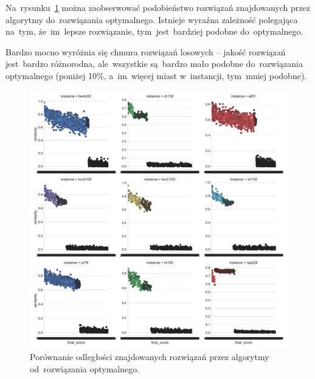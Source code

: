 Na~rysunku~\ref{fig:sim} można zaobserwować podobieństwo rozwiązań znajdowanych przez algorytmy do~rozwiązania optymalnego. Istnieje wyraźna zależność polegająca na~tym, że~im~lepsze rozwiązanie, tym~jest~bardziej podobne do~optymalnego.

Bardzo mocno wyróżnia się chmura rozwiązań losowych -- jakość rozwiązań jest~bardzo różnorodna, ale~wszystkie są~bardzo mało podobne do~rozwiązania optymalnego (poniżej 10\%, a~im~więcej miast w~instancji, tym~mniej podobne).

\begin{figure}[H]
\begin{center}
\includegraphics[width=1.0\textwidth]{graphs/similarity_comparision.pdf}
\end{center}
\caption{Porównanie odległości znajdowanych rozwiązań przez algorytmy od~rozwiązania optymalnego.}
\label{fig:sim}
\end{figure}